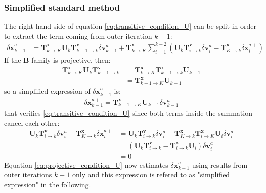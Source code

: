 \documentclass[npg, manuscript]{copernicus}
\begin{document}
\subsubsection{Simplified standard method}
The right-hand side of equation \eqref{eq:transitive_condition_U} can be split in order to extract the term coming from outer iteration $k-1$:
\begin{align}
\delta \mathbf{x}^{a+}_{k-1} & = \mathbf{T}^\mathbf{x}_{k \rightarrow K} \mathbf{U}_k \mathbf{T}^\mathbf{v}_{k-1 \rightarrow k} \delta \mathbf{v}^a_{k-1} + \mathbf{T}^\mathbf{x}_{k \rightarrow K} \sum_{i=1}^{k-2} \left(\mathbf{U}_k \mathbf{T}^\mathbf{v}_{i \rightarrow k} \delta \mathbf{v}^a_i - \mathbf{T}^\mathbf{x}_{K \rightarrow k} \delta \mathbf{x}^{a+}_i\right)
\end{align}
If the $\mathbf{B}$ family is projective, then:
\begin{align}
\mathbf{T}^\mathbf{x}_{k \rightarrow K} \mathbf{U}_k \mathbf{T}^\mathbf{v}_{k-1 \rightarrow k} & = \mathbf{T}^\mathbf{x}_{k \rightarrow K} \mathbf{T}^\mathbf{x}_{k-1 \rightarrow k} \mathbf{U}_{k-1} \nonumber \\
& = \mathbf{T}^\mathbf{x}_{k-1 \rightarrow K} \mathbf{U}_{k-1}
\end{align}
so a simplified expression of $\delta \mathbf{x}^{a+}_{k-1}$ is:
\begin{align}
\label{eq:projective_condition_U}
\boxed{\delta \mathbf{x}^{a+}_{k-1} = \mathbf{T}^\mathbf{x}_{k-1 \rightarrow K} \mathbf{U}_{k-1} \delta \mathbf{v}^a_{k-1}}
\end{align}
that verifies \eqref{eq:transitive_condition_U} since both terms inside the summation cancel each other:
\begin{align}
\mathbf{U}_k \mathbf{T}^\mathbf{v}_{i \rightarrow k} \delta \mathbf{v}^a_i - \mathbf{T}^\mathbf{x}_{K \rightarrow k} \delta \mathbf{x}^{a+}_i & = \mathbf{U}_k \mathbf{T}^\mathbf{v}_{i \rightarrow k} \delta \mathbf{v}^a_i - \mathbf{T}^\mathbf{x}_{K \rightarrow k} \mathbf{T}^\mathbf{x}_{i \rightarrow K} \mathbf{U}_i \delta \mathbf{v}^a_i \nonumber \\
& = \left(\mathbf{U}_k \mathbf{T}^\mathbf{v}_{i \rightarrow k} - \mathbf{T}^\mathbf{x}_{i \rightarrow k} \mathbf{U}_i \right) \delta \mathbf{v}^a_i \nonumber \\
& = 0
\end{align}
Equation \eqref{eq:projective_condition_U} now estimates $\delta \mathbf{x}^{a+}_{k-1}$ using results from outer iterations $k-1$ only and this expression is refered to as "simplified expression" in the following.
\end{document}
